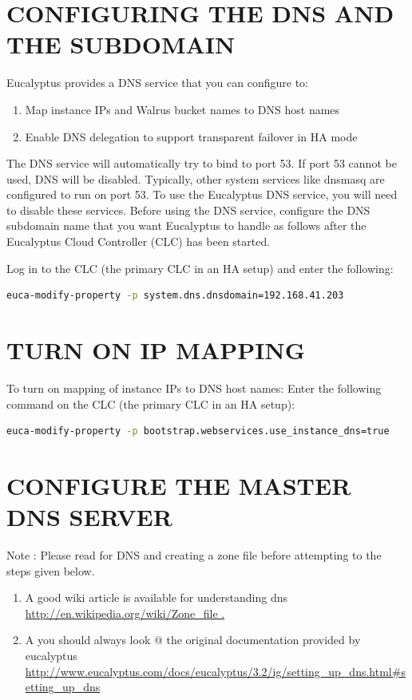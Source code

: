 \section{CONFIGURING THE DNS AND THE SUBDOMAIN}

Eucalyptus provides a DNS service that you can configure to:
\begin{enumerate}
\item Map instance IPs and Walrus bucket names to DNS host names
\item Enable DNS delegation to support transparent failover in HA mode
\end{enumerate}
The DNS service will automatically try to bind to port 53. If port 53 cannot be used, DNS will be disabled. Typically, other system services like dnsmasq are configured to run on port 53. To use the Eucalyptus DNS service, you will need to disable these services.
Before using the DNS service, configure the DNS subdomain name that you want Eucalyptus to handle as follows after the Eucalyptus Cloud Controller (CLC) has been started.

Log in to the CLC (the primary CLC in an HA setup) and enter the following:
\begin{lstlisting}[language=bash]
euca-modify-property -p system.dns.dnsdomain=192.168.41.203
\end{lstlisting}
\section{TURN ON IP MAPPING}

To turn on mapping of instance IPs to DNS host names:
Enter the following command on the CLC (the primary CLC in an HA setup):
\begin{lstlisting}[language=bash]
euca-modify-property -p bootstrap.webservices.use_instance_dns=true

\end{lstlisting}

\section{CONFIGURE THE MASTER DNS SERVER}

Note : Please read for DNS and creating a zone file before attempting to the steps given below.
\begin{enumerate}
\item A good wiki article is available for understanding dns \url{http://en.wikipedia.org/wiki/Zone_file .}
\item A you should always look @ the original documentation provided by eucalyptus \url{http://www.eucalyptus.com/docs/eucalyptus/3.2/ig/setting_up_dns.html#setting_up_dns}
\end{enumerate}


